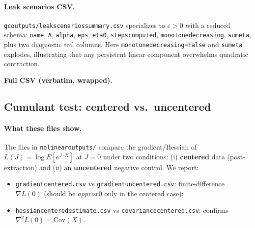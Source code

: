\documentclass[11pt]{article}
\def\E{E}%
\def\_{}%
\def\approx{approx}%
\theoremstyle{definition}
\theoremstyle{remark}
\newcommand{\E}{\mathbb{E}}
\newcommand{\Cov}{\mathrm{Cov}}
\newcommand{\1}{\mathbbm{1}}
\begin{document}
\paragraph{Leak scenarios CSV.}
\texttt{qc\_outputs/leak\_scenarios\_summary.csv} specializes to $\varepsilon>0$ with a reduced schema:
\texttt{name}, \texttt{A}, \texttt{alpha}, \texttt{eps}, \texttt{eta0}, \texttt{steps\_computed}, \texttt{monotone\_decreasing}, \texttt{sum\_eta}, plus two diagnostic tail columns. Here \texttt{monotone\_decreasing=False} and \texttt{sum\_eta} explodes, illustrating that any persistent linear component overwhelms quadratic contraction.

\noindent\textbf{Full CSV (verbatim, wrapped).}

\subsection{Cumulant test: centered vs.\ uncentered}\label{sec:cumulant}
\paragraph{What these files show.}
The files in \texttt{no\_linear\_outputs/} compare the gradient/Hessian of
\(L(J)=\log \E[e^{J\cdot X}]\) at \(J=0\) under two conditions:
(i) \textbf{centered} data (post-extraction) and
(ii) an \textbf{uncentered} negative control.
We report:
\begin{itemize}[leftmargin=2em]
  \item \texttt{gradient\_centered.csv} vs \texttt{gradient\_uncentered.csv}: finite-difference $\nabla L(0)$ (should be $\approx 0$ only in the centered case);
  \item \texttt{hessian\_centered\_estimate.csv} vs \texttt{covariance\_centered.csv}: confirms $\nabla^2 L(0)=\Cov(X)$.
\end{itemize}
\end{document}
